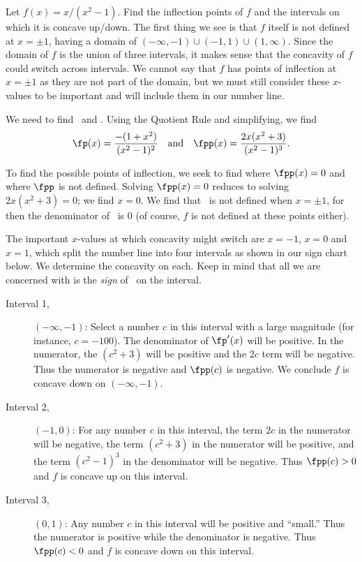 \begin{example}\label{ex_conc2}%
Let $f(x)=x/(x^2-1)$. Find the inflection points of $f$ and the intervals on which it is concave up/down.
\solution
The first thing we see is that $f$ itself is not defined at $x=\pm1$, having a domain of $(-\infty,-1)\cup(-1,1)\cup(1,\infty)$. Since the domain of $f$ is the union of three intervals, it makes sense that the concavity of $f$ could switch across intervals. We cannot say that $f$ has points of inflection at $x=\pm1$ as they are not part of the domain, but we must still consider these $x$-values to be important and will include them in our number line.

We need to find \fp\ and \fpp. Using the Quotient Rule and simplifying, we find
\[
\fp(x)=\frac{-(1+x^2)}{(x^2-1)^2}
\quad \text{and}\quad
\fpp(x) = \frac{2x(x^2+3)}{(x^2-1)^3}.
\]

To find the possible points of inflection, we seek to find where $\fpp(x)=0$ and where $\fpp$ is not defined. Solving $\fpp(x)=0$ reduces to solving $2x(x^2+3)=0$; we find $x=0$.  We find that \fpp\ is not defined when $x=\pm 1$, for then the denominator of \fpp\ is 0 (of course, $f$ is not defined at these points either).

The important $x$-values at which concavity might switch are $x=-1$, $x=0$ and $x=1$, which  split the number line into four intervals as shown in our sign chart below. We determine the concavity on each. Keep in mind that all we are concerned with is the \emph{sign} of \fpp\ on the interval.\bigskip

\begin{description}%
\item[Interval 1,] $(-\infty,-1)$: Select a number $c$ in this interval with a large magnitude (for instance, $c=-100$). The denominator of $\fp'(x)$ will be positive. In the numerator, the $(c^2+3)$ will be positive and the $2c$ term will be negative. Thus the numerator is negative and $\fpp(c)$ is negative. We conclude $f$ is concave down on $(-\infty,-1)$.

\item[Interval 2,] $(-1,0)$: For any number $c$ in this interval, the term $2c$ in the numerator will be negative, the term $(c^2+3)$ in the numerator will be positive, and the term $(c^2-1)^3$ in the denominator will be negative. Thus $\fpp(c)>0$ and $f$ is concave up on this interval.

\item[Interval 3,] $(0,1)$: Any number $c$ in this interval will be positive and ``small.'' Thus the numerator is positive while the denominator is negative. Thus $\fpp(c)<0$ and $f$ is concave down on this interval.


\end{description}
\end{example}
